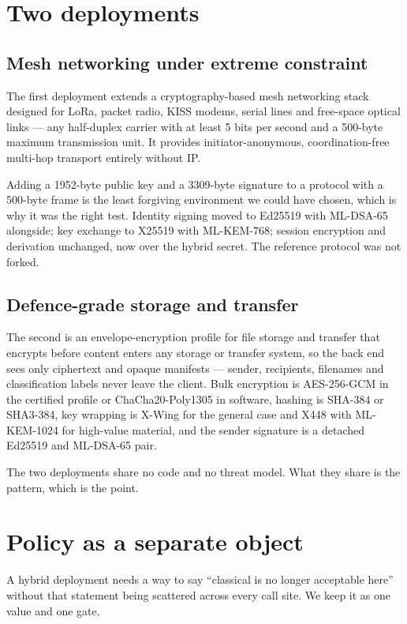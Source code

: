 \documentclass[11pt,a4paper]{article}
\begin{document}
\section{Two deployments}

\subsection{Mesh networking under extreme constraint}

The first deployment extends a cryptography-based mesh networking stack designed
for LoRa, packet radio, KISS modems, serial lines and free-space optical links
--- any half-duplex carrier with at least 5 bits per second and a 500-byte
maximum transmission unit. It provides initiator-anonymous, coordination-free
multi-hop transport entirely without IP.

Adding a 1952-byte public key and a 3309-byte signature to a protocol with a
500-byte frame is the least forgiving environment we could have chosen, which is
why it was the right test. Identity signing moved to Ed25519 with ML-DSA-65
alongside; key exchange to X25519 with ML-KEM-768; session encryption and
derivation unchanged, now over the hybrid secret. The reference protocol was not
forked.

\subsection{Defence-grade storage and transfer}

The second is an envelope-encryption profile for file storage and transfer that
encrypts before content enters any storage or transfer system, so the back end
sees only ciphertext and opaque manifests --- sender, recipients, filenames and
classification labels never leave the client. Bulk encryption is AES-256-GCM in
the certified profile or ChaCha20-Poly1305 in software, hashing is SHA-384 or
SHA3-384, key wrapping is X-Wing for the general case and X448 with ML-KEM-1024
for high-value material, and the sender signature is a detached Ed25519 and
ML-DSA-65 pair.

The two deployments share no code and no threat model. What they share is the
pattern, which is the point.

\section{Policy as a separate object}

A hybrid deployment needs a way to say ``classical is no longer acceptable
here'' without that statement being scattered across every call site. We keep it
as one value and one gate.
\end{document}
